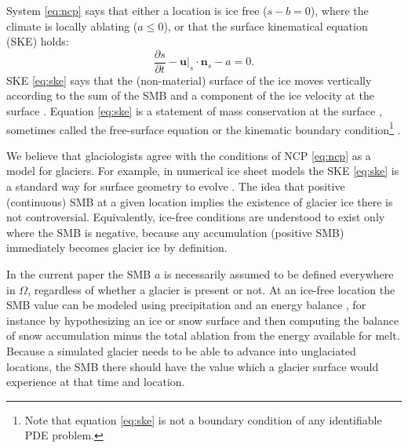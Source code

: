 \documentclass[hidelinks,onefignum,onetabnum,final]{siamart220329}  %
\newcommand{\bn}{\mathbf{n}}
\newcommand{\bu}{\mathbf{u}}
\begin{document}
System \eqref{eq:ncp} says that either a location is ice free ($s-b=0$), where the climate is locally ablating ($a\le 0$), or that the surface kinematical equation (SKE) holds:
\begin{equation}
\frac{\partial s}{\partial t} - \bu|_s \cdot \bn_s - a = 0.  \label{eq:ske}
\end{equation}
SKE \eqref{eq:ske} says that the (non-material) surface of the ice moves vertically according to the sum of the SMB and a component of the ice velocity at the surface \cite{SchoofHewitt2013}.  Equation \eqref{eq:ske} is a statement of mass conservation at the surface \cite{Aschwandenetal2012}, sometimes called the free-surface equation \cite{LofgrenAhlkronaHelanow2022} or the kinematic boundary condition\footnote{Note that equation \eqref{eq:ske} is not a boundary condition of any identifiable PDE problem.} \cite{GreveBlatter2009}.

We believe that glaciologists agree with the conditions of NCP \eqref{eq:ncp} as a model for glaciers.  For example, in numerical ice sheet models the SKE \eqref{eq:ske} is a standard way for surface geometry to evolve \cite{GreveBlatter2009,SchoofHewitt2013}.  The idea that positive (continuous) SMB at a given location implies the existence of glacier ice there is not controversial.  Equivalently, ice-free conditions are understood to exist only where the SMB is negative, because any accumulation (positive SMB) immediately becomes glacier ice by definition.

In the current paper the SMB $a$ is necessarily assumed to be defined everywhere in $\Omega$, regardless of whether a glacier is present or not.  At an ice-free location the SMB value can be modeled using precipitation and an energy balance \cite{GreveBlatter2009}, for instance by hypothesizing an ice or snow surface and then computing the balance of snow accumulation minus the total ablation from the energy available for melt.  Because a simulated glacier needs to be able to advance into unglaciated locations, the SMB there should have the value which a glacier surface would experience at that time and location.
\end{document}
